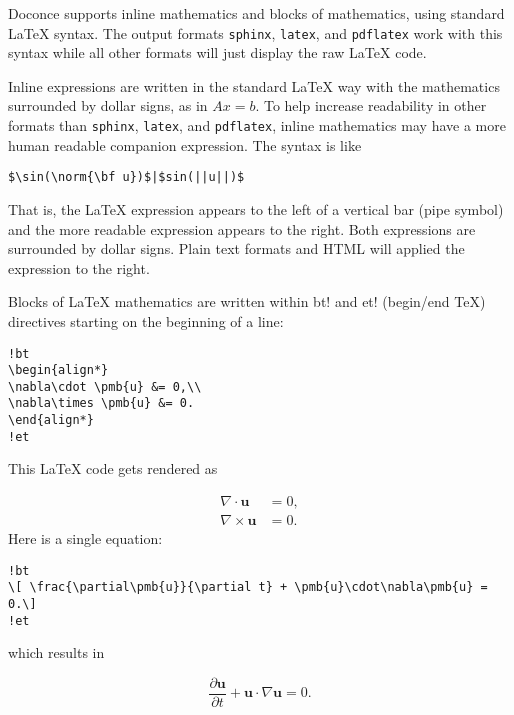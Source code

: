 \documentclass[%
oneside,                 %
final,                   %
10pt]{article}
\begin{document}
Doconce supports inline mathematics and blocks of mathematics, using
standard {\LaTeX} syntax. The output formats \Verb!sphinx!, \Verb!latex!, and \Verb!pdflatex!
work with this syntax while all other formats will just display the
raw {\LaTeX} code.

Inline expressions are written in the standard
{\LaTeX} way with the mathematics surrounded by dollar signs, as in
$Ax=b$. To help increase readability in other formats than \Verb!sphinx!,
\Verb!latex!, and \Verb!pdflatex!, inline mathematics may have a more human
readable companion expression. The syntax is like
\begin{Verbatim}[numbers=none,fontsize=\fontsize{9pt}{9pt},baselinestretch=0.85,xleftmargin=0mm]
$\sin(\norm{\bf u})$|$sin(||u||)$
\end{Verbatim}
That is, the {\LaTeX} expression appears to the left of a vertical bar (pipe
symbol) and the more readable expression appears to the right. Both
expressions are surrounded by dollar signs. Plain text formats and HTML
will applied the expression to the right.

Blocks of {\LaTeX} mathematics are written within
\Verb!!bt!
and
\Verb!!et! (begin/end TeX) directives starting on the beginning of a line:

\begin{Verbatim}[numbers=none,fontsize=\fontsize{9pt}{9pt},baselinestretch=0.85,xleftmargin=0mm]
!bt
\begin{align*}
\nabla\cdot \pmb{u} &= 0,\\
\nabla\times \pmb{u} &= 0.
\end{align*}
!et
\end{Verbatim}
This {\LaTeX} code gets rendered as

\begin{align*}
\nabla\cdot \pmb{u} &= 0,\\
\nabla\times \pmb{u} &= 0.
\end{align*}
Here is a single equation:

\begin{Verbatim}[numbers=none,fontsize=\fontsize{9pt}{9pt},baselinestretch=0.85,xleftmargin=0mm]
!bt
\[ \frac{\partial\pmb{u}}{\partial t} + \pmb{u}\cdot\nabla\pmb{u} = 0.\]
!et
\end{Verbatim}
which results in

\[ \frac{\partial\pmb{u}}{\partial t} + \pmb{u}\cdot\nabla\pmb{u} = 0.\]
\end{document}
